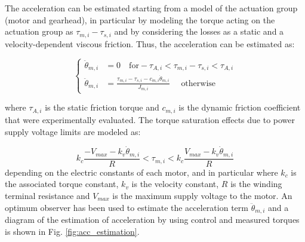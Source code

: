 The acceleration can be estimated starting from a model of the actuation group (motor and gearhead), in particular by modeling the torque acting on the actuation group as $\tau_{m,i}-\tau_{s,i}$ and by considering the losses as a static and a velocity-dependent viscous friction. Thus, the acceleration can be estimated as:




\begin{equation}
\label{tau_acc}
\left \{
\begin{aligned}
\ddot{\theta}_{m,i} & =0 \quad \text{for} -\tau_{A,i}<\tau_{m,i}-\tau_{s,i}<\tau_{A,i} \\
\ddot{\theta}_{m,i} & =\frac{\tau_{m,i}-\tau_{s,i}  -c_{m,i}\dot{\theta}_{m,i}}{J_{m,i}} \quad \text{ otherwise}
\end{aligned}
\right .
\end{equation}

where $\tau_{A,i}$ is the static friction torque and $c_{m,i}$ is the dynamic friction coefficient that were experimentally evaluated.
The torque saturation effects due to power supply voltage limits are modeled as:

\begin{equation}
k_c\frac{-V_{max}-k_v\dot{\theta}_{m,i}}{R}<\tau_{m,i}<k_c\frac{V_{max}-k_v\dot{\theta}_{m,i}}{R}
\label{torque_saturation}
\end{equation}
depending on the electric constants of each motor, and in particular  where $k_c$ is the associated torque constant, $k_v$ is the velocity constant, $R$ is the winding terminal resistance and $V_{max}$ is the maximum supply voltage to the motor.
An optimum  observer has been used to estimate the acceleration term $\ddot{\theta}_{m,i}$ and a diagram of the estimation of acceleration by using control and measured torques is shown in Fig. \ref{fig:acc_estimation}.

\begin{figure*}[htb]
	\centering
	\def\svgwidth{2.15\columnwidth}
	\begin{footnotesize}
		
	\end{footnotesize}
	\caption{Estimation scheme of the acceleration from torque measurement. The left side of the scheme models the motor dynamics and it considers saturation effects. The right side shows the implementation scheme of the observer.}
	\label{fig:acc_estimation}
\end{figure*}
%
%

